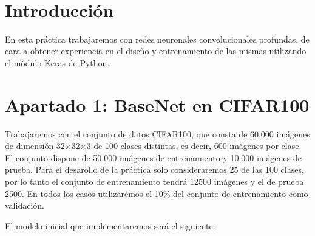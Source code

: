 \documentclass[12pt, spanish]{article}
\makeatletter
\let\thedate\@date
\makeatother
\begin{document}
\begin{titlepage}
    {\large \thedate}\\[0.5cm]
    {\doclicenseThis}

    \vfill

\end{titlepage}


\tableofcontents
\pagebreak



\section*{Introducción}

En esta práctica trabajaremos con redes neuronales convolucionales profundas, de cara a obtener experiencia en el diseño y entrenamiento de las mismas utilizando el módulo Keras de Python.

\section{Apartado 1: BaseNet en CIFAR100}

Trabajaremos con el conjunto de datos CIFAR100, que consta de 60.000 imágenes de dimensión 32$\times$32$\times$3 de 100 clases distintas, es decir, 600 imágenes por clase. El conjunto dispone de 50.000 imágenes de entrenamiento y 10.000 imágenes de prueba. Para el desarollo de la práctica solo consideraremos 25 de las 100 clases, por lo tanto el conjunto de entrenamiento tendrá 12500 imágenes y el de prueba 2500. En todos los casos utilizarémos el 10\% del conjunto de entrenamiento como validación.


El modelo inicial que implementaremos será el siguiente:
\end{document}
